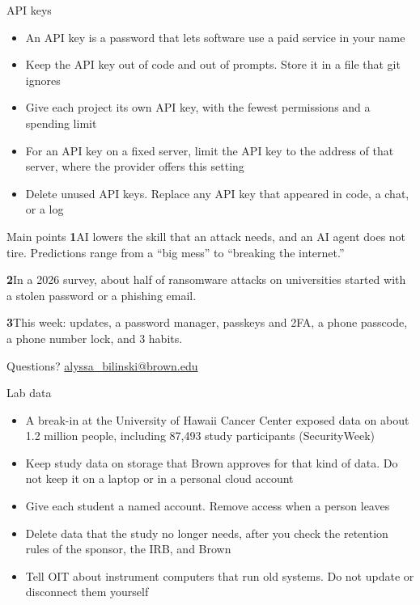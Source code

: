 \documentclass[11pt]{beamer}
\newcommand{\srccite}[1]{{\scriptsize\textcolor{citecol}{#1}}}
\newcommand{\rmapnum}[1]{\textcolor{brownred}{\textbf{#1}}}
\newcommand{\vfy}{\unskip}
\newcommand{\vfy}{\unskip\nobreakspace{\scriptsize\textcolor{citecol}{[verify]}}}
\renewcommand{\srccite}[1]{{\scriptsize\textcolor{citecol}{\mbox{#1}}}}
\begin{document}
\begin{frame}{API keys}
\pause
\begin{itemize}\setlength\itemsep{9pt}
\item An API key is a password that lets software use a paid service in your name \pause
\item Keep the API key out of code and out of prompts. Store it in a file that git ignores \pause
\item Give each project its own API key, with the fewest permissions and a spending limit \pause
\item For an API key on a fixed server, limit the API key to the address of that server, where the provider offers this setting \pause
\item Delete unused API keys. Replace any API key that appeared in code, a chat, or a log
\end{itemize}
\end{frame}


\begin{frame}{Main points}
\vfill
\pause
{\large\rmapnum{1}\quad AI lowers the skill that an attack needs, and an AI agent does not tire. Predictions range from a ``big mess'' to ``breaking the internet.''}\par
\vfill
\pause
{\large\rmapnum{2}\quad In a 2026 survey, about half of ransomware attacks on universities started with a stolen password or a phishing email.}\par
\vfill
\pause
{\large\rmapnum{3}\quad This week: updates, a password manager, passkeys and 2FA, a phone passcode, a phone number lock, and 3 habits.}\par
\vfill
\end{frame}


\begin{frame}{Questions?}
\vfill
\centering
\href{mailto:alyssa_bilinski@brown.edu}{alyssa\_bilinski@brown.edu}\par
\vfill
\end{frame}


\begin{frame}{Lab data}
\pause
\begin{itemize}\setlength\itemsep{8pt}
\item A break-in at the University of Hawaii Cancer Center exposed data on about 1.2 million people, including 87,493 study participants \srccite{(SecurityWeek)} \vfy \pause
\item Keep study data on storage that Brown approves for that kind of data. Do not keep it on a laptop or in a personal cloud account \pause
\item Give each student a named account. Remove access when a person leaves \pause
\item Delete data that the study no longer needs, after you check the retention rules of the sponsor, the IRB, and Brown \pause
\item Tell OIT about instrument computers that run old systems. Do not update or disconnect them yourself
\end{itemize}
\end{frame}
\end{document}
